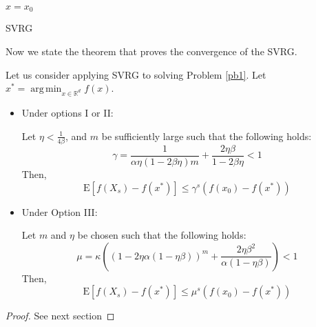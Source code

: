 \documentclass[12pt]{report}
\newcounter{theo}[section]
\newenvironment{theo}[2][]{%
    \refstepcounter{theo}
\newcommand*{\defeq}{\mathrel{\vcenter{\baselineskip0.5ex \lineskiplimit0pt
                     \hbox{\scriptsize.}\hbox{\scriptsize.}}}%
                     =} 
 
\begin{mdframed}[]\relax}{%
\end{mdframed}}
\newcommand{\E}{\mathrm{E}}
\DeclareMathOperator*\argmin{arg\,min}
\begin{document}
\begin{algorithm}[H]\label{SVRG}
    $x=x_0$\;
    \caption{SVRG}
\end{algorithm}

Now we state the theorem that proves the convergence of the SVRG.

\begin{theo}
LLet us consider applying SVRG to solving Problem \ref{pb1}.
Let $x^*=\argmin_{x\in\mathbb{R}^d} f(x)$.
\begin{itemize}
    \item Under options I or II:
    
    Let $\eta<\frac{1}{4\beta}$, and $m$ be sufficiently large such that the following holds:
\begin{equation}
    \gamma=\frac{1}{\alpha\eta(1-2\beta\eta)m}+\frac{2\eta\beta}{1-2\beta\eta}<1
\end{equation}   
Then,
\begin{equation}
    \E[f(X_s)-f(x^*)]\leq \gamma^s(f(x_0)-f(x^*))
\end{equation}

    \item Under Option III:
    
    Let $m$ and $\eta$ be chosen such that the following holds:
\begin{equation}
    \mu=\kappa\left(\left(1-2\eta\alpha(1-\eta\beta)\right)^m+\frac{2\eta\beta^2}{\alpha(1-\eta\beta)}\right)<1
\end{equation}
Then,
\begin{equation}
    \E[f(X_s)-f(x^*)]\leq \mu^s(f(x_0)-f(x^*))
\end{equation}

\end{itemize}




\end{theo}
\begin{proof}
See next section
\end{proof}
\end{document}
